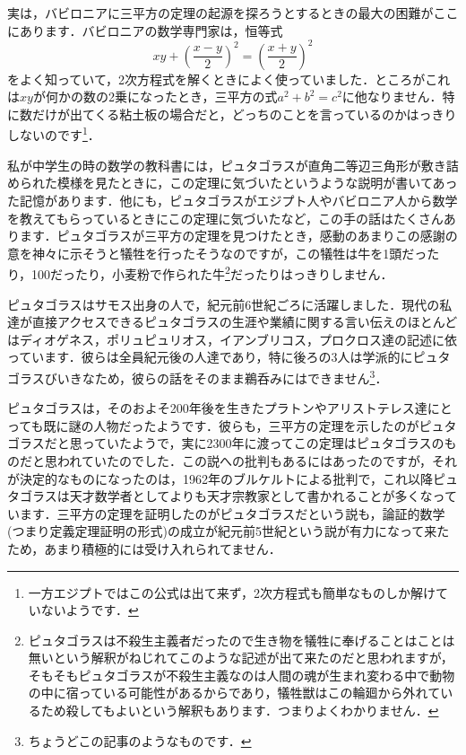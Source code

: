 \documentclass[./main]{subfiles}
\begin{document}
実は，バビロニアに三平方の定理の起源を探ろうとするときの最大の困難がここにあります．バビロニアの数学専門家は，恒等式
\begin{equation}
	xy + \left( \frac{x-y}{2} \right)^2 = \left( \frac{x+y}{2} \right)^2
\end{equation}
をよく知っていて，2次方程式を解くときによく使っていました．ところがこれは$xy$が何かの数の2乗になったとき，三平方の式$a^2 + b^2 = c^2$に他なりません．特に数だけが出てくる粘土板の場合だと，どっちのことを言っているのかはっきりしないのです\footnote{一方エジプトではこの公式は出て来ず，2次方程式も簡単なものしか解けていないようです．}．


私が中学生の時の数学の教科書には，ピュタゴラスが直角二等辺三角形が敷き詰められた模様を見たときに，この定理に気づいたというような説明が書いてあった記憶があります．他にも，ピュタゴラスがエジプト人やバビロニア人から数学を教えてもらっているときにこの定理に気づいたなど，この手の話はたくさんあります．ピュタゴラスが三平方の定理を見つけたとき，感動のあまりこの感謝の意を神々に示そうと犠牲を行ったそうなのですが，この犠牲は牛を1頭だったり，100だったり，小麦粉で作られた牛\footnote{\cite{Por} ピュタゴラスは不殺生主義者だったので生き物を犠牲に奉げることはことは無いという解釈がねじれてこのような記述が出て来たのだと思われますが，そもそもピュタゴラスが不殺生主義なのは人間の魂が生まれ変わる中で動物の中に宿っている可能性があるからであり，犠牲獣はこの輪廻から外れているため殺してもよいという解釈もあります．つまりよくわかりません．}だったりはっきりしません．

ピュタゴラスはサモス出身の人で，紀元前6世紀ごろに活躍しました．現代の私達が直接アクセスできるピュタゴラスの生涯や業績に関する言い伝えのほとんどはディオゲネス，ポリュピュリオス，イアンブリコス，プロクロス達の記述に依っています．彼らは全員紀元後の人達であり，特に後ろの3人は学派的にピュタゴラスびいきなため，彼らの話をそのまま鵜呑みにはできません\footnote{ちょうどこの記事のようなものです．}．

ピュタゴラスは，そのおよそ200年後を生きたプラトンやアリストテレス達にとっても既に謎の人物だったようです．彼らも，三平方の定理を示したのがピュタゴラスだと思っていたようで，実に2300年に渡ってこの定理はピュタゴラスのものだと思われていたのでした．この説への批判もあるにはあったのですが，それが決定的なものになったのは，1962年のブルケルトによる批判で，これ以降ピュタゴラスは天才数学者としてよりも天才宗教家として書かれることが多くなっています．三平方の定理を証明したのがピュタゴラスだという説も，論証的数学(つまり定義定理証明の形式)の成立が紀元前5世紀という説が有力になって来たため，あまり積極的には受け入れられてません．
\end{document}

